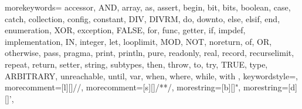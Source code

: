 \usepackage[T1]{fontenc} %
\usepackage{amsmath}  %
\usepackage{amssymb}  %
\usepackage{mathtools}  %
\usepackage{amssymb}  %
\usepackage{mathtools}  %
\usepackage{url}  %
\usepackage{hyperref}  %
\hypersetup{
    colorlinks=true,
    linkcolor=blue,
    filecolor=magenta,
    urlcolor=cyan
}

\usepackage{listings}
{
    morekeywords={
      accessor,
      AND,
      array,
      as,
      assert,
      begin,
      bit,
      bits,
      boolean,
      case,
      catch,
      collection,
      config,
      constant,
      DIV,
      DIVRM,
      do,
      downto,
      else,
      elsif,
      end,
      enumeration,
      XOR,
      exception,
      FALSE,
      for,
      func,
      getter,
      if,
      impdef,
      implementation,
      IN,
      integer,
      let,
      looplimit,
      MOD,
      NOT,
      noreturn,
      of,
      OR,
      otherwise,
      pass,
      pragma,
      print,
      println,
      pure,
      readonly,
      real,
      record,
      recurselimit,
      repeat,
      return,
      setter,
      string,
      subtypes,
      then,
      throw,
      to,
      try,
      TRUE,
      type,
      ARBITRARY,
      unreachable,
      until,
      var,
      when,
      where,
      while,
      with
    },
    keywordstyle=\color{red},
    morecomment=[l][\color{blue}]{//},
    morecomment=[s][\color{blue}]{/*}{*/},
    morestring=[b][\color{cyan}]",
    morestring=[d][\color{cyan}]',
}

\usepackage{xcolor}

\usepackage[inline]{enumitem}  %
\usepackage[export]{adjustbox}  %
\usepackage[export]{adjustbox}  %
\usepackage{mathpartir}  %
\usepackage{comment}
\usepackage{fancyvrb}
\usepackage[
  twoside,
  marginparwidth=100pt,
  top=4.5cm, bottom=4.5cm, inner=3.5cm, outer=4.5cm
]{geometry}




